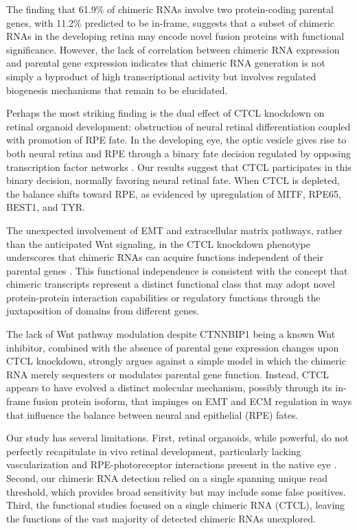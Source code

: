 \documentclass[12pt]{article}
\begin{document}
The finding that 61.9\% of chimeric RNAs involve two protein-coding parental genes, with 11.2\% predicted to be in-frame, suggests that a subset of chimeric RNAs in the developing retina may encode novel fusion proteins with functional significance. However, the lack of correlation between chimeric RNA expression and parental gene expression indicates that chimeric RNA generation is not simply a byproduct of high transcriptional activity but involves regulated biogenesis mechanisms that remain to be elucidated.

Perhaps the most striking finding is the dual effect of CTCL knockdown on retinal organoid development: obstruction of neural retinal differentiation coupled with promotion of RPE fate. In the developing eye, the optic vesicle gives rise to both neural retina and RPE through a binary fate decision regulated by opposing transcription factor networks \citep{fuhrmann2014eye,bharti2006transcription}. Our results suggest that CTCL participates in this binary decision, normally favoring neural retinal fate. When CTCL is depleted, the balance shifts toward RPE, as evidenced by upregulation of MITF, RPE65, BEST1, and TYR.

The unexpected involvement of EMT and extracellular matrix pathways, rather than the anticipated Wnt signaling, in the CTCL knockdown phenotype underscores that chimeric RNAs can acquire functions independent of their parental genes \citep{wu2019chimeric}. This functional independence is consistent with the concept that chimeric transcripts represent a distinct functional class that may adopt novel protein-protein interaction capabilities or regulatory functions through the juxtaposition of domains from different genes.

The lack of Wnt pathway modulation despite CTNNBIP1 being a known Wnt inhibitor, combined with the absence of parental gene expression changes upon CTCL knockdown, strongly argues against a simple model in which the chimeric RNA merely sequesters or modulates parental gene function. Instead, CTCL appears to have evolved a distinct molecular mechanism, possibly through its in-frame fusion protein isoform, that impinges on EMT and ECM regulation in ways that influence the balance between neural and epithelial (RPE) fates.

Our study has several limitations. First, retinal organoids, while powerful, do not perfectly recapitulate in vivo retinal development, particularly lacking vascularization and RPE-photoreceptor interactions present in the native eye \citep{capowski2019reproducibility}. Second, our chimeric RNA detection relied on a single spanning unique read threshold, which provides broad sensitivity but may include some false positives. Third, the functional studies focused on a single chimeric RNA (CTCL), leaving the functions of the vast majority of detected chimeric RNAs unexplored.
\end{document}
